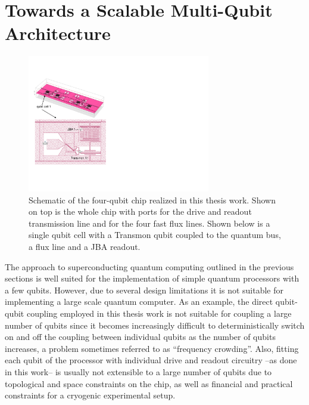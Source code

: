 \section{Towards a Scalable Multi-Qubit Architecture}

\begin{figure}
	\centering
	\includegraphics[width=8cm]{./material/figures/scalable-architecture/scalable_architecture_schematic}
	\caption[Schematic of the four-qubit chip realized in this work]{Schematic of the four-qubit chip realized in this thesis work. Shown on top is the whole chip with ports for the drive and readout transmission line and for the four fast flux lines. Shown below is a single qubit cell with a Transmon qubit coupled to the quantum bus, a flux line and a JBA readout.}
	\label{fig:scalable_architecture_photo}
\end{figure}

The approach to superconducting quantum computing outlined in the previous sections is well suited for the implementation of simple quantum processors with a few qubits. However, due to several design limitations it is not suitable for implementing a large scale quantum computer. As an example, the direct qubit-qubit coupling employed in this thesis work is not suitable for coupling a large number of qubits since it becomes increasingly difficult to deterministically switch on and off the coupling between individual qubits as the number of qubits increases, a problem sometimes referred to as ``frequency crowding''. Also, fitting each qubit of the processor with individual drive and readout circuitry --as done in this work-- is usually not extensible to a large number of qubits due to topological and space constraints on the chip, as well as financial and practical constraints for a cryogenic experimental setup.

\smallskip


